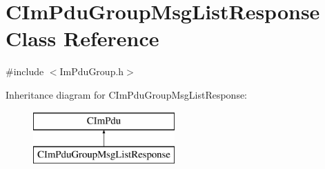 \hypertarget{class_c_im_pdu_group_msg_list_response}{}\section{C\+Im\+Pdu\+Group\+Msg\+List\+Response Class Reference}
\label{class_c_im_pdu_group_msg_list_response}


{\ttfamily \#include $<$Im\+Pdu\+Group.\+h$>$}

Inheritance diagram for C\+Im\+Pdu\+Group\+Msg\+List\+Response\+:\begin{figure}[H]
\begin{center}
\leavevmode
\includegraphics[height=2.000000cm]{class_c_im_pdu_group_msg_list_response}
\end{center}
\end{figure}
